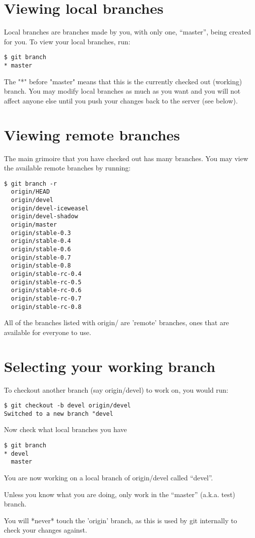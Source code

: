 \documentclass[a4paper,10pt]{book}
\begin{document}
\section{Viewing local branches}
Local branches are branches made by you, with only one, ``master'', being
created for you. To view your local branches, run:
\begin{verbatim}
$ git branch
* master
\end{verbatim}
The "*" before "master" means that this is the currently checked out
(working) branch. You may modify local branches as much as you want and you
will not affect anyone else until you push your changes back to the server
(see below).

\section{Viewing remote branches}
The main grimoire that you have checked out has many branches. You may view
the available remote branches by running:
\begin{verbatim}
$ git branch -r
  origin/HEAD
  origin/devel
  origin/devel-iceweasel
  origin/devel-shadow
  origin/master
  origin/stable-0.3
  origin/stable-0.4
  origin/stable-0.6
  origin/stable-0.7
  origin/stable-0.8
  origin/stable-rc-0.4
  origin/stable-rc-0.5
  origin/stable-rc-0.6
  origin/stable-rc-0.7
  origin/stable-rc-0.8
\end{verbatim}
All of the branches listed with origin/ are 'remote' branches, ones that are
available for everyone to use.

\section{Selecting your working branch}
To checkout another branch (say origin/devel) to work on, you would run:
\begin{verbatim}
$ git checkout -b devel origin/devel
Switched to a new branch "devel
\end{verbatim}
Now check what local branches you have
\begin{verbatim}
$ git branch
* devel
  master
\end{verbatim}
You are now working on a local branch of origin/devel called ``devel''.

Unless you know what you are doing, only work in the ``master'' (a.k.a. test)
branch.

You will *never* touch the 'origin' branch, as this is used by git
internally to check your changes against.
\end{document}
